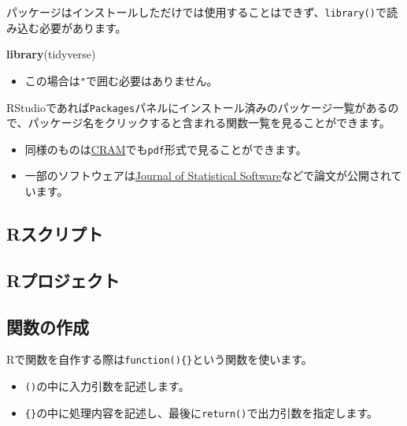 \documentclass[]{bxjsarticle}
\newenvironment{Shaded}{\begin{snugshade}}{\end{snugshade}}
\newcommand{\KeywordTok}[1]{\textcolor[rgb]{0.13,0.29,0.53}{\textbf{#1}}}
\newcommand{\NormalTok}[1]{#1}
\providecommand{\tightlist}{%
  \setlength{\itemsep}{0pt}\setlength{\parskip}{0pt}}
\begin{document}
パッケージはインストールしただけでは使用することはできず、\texttt{library()}で読み込む必要があります。

\begin{Shaded}
\begin{Highlighting}[]
\KeywordTok{library}\NormalTok{(tidyverse)}
\end{Highlighting}
\end{Shaded}

\begin{itemize}
\tightlist
\item
  この場合は\texttt{"}で囲む必要はありません。
\end{itemize}

RStudioであれば\texttt{Packages}パネルにインストール済みのパッケージ一覧があるので、パッケージ名をクリックすると含まれる関数一覧を見ることができます。

\begin{itemize}
\tightlist
\item
  同様のものは\href{https://cran.r-project.org/}{CRAM}でも\texttt{pdf}形式で見ることができます。
\item
  一部のソフトウェアは\href{https://www.jstatsoft.org/index}{Journal of Statistical Software}などで論文が公開されています。
\end{itemize}

\hypertarget{rux30b9ux30afux30eaux30d7ux30c8}{%
\subsection{Rスクリプト}\label{rux30b9ux30afux30eaux30d7ux30c8}}

\hypertarget{rux30d7ux30edux30b8ux30a7ux30afux30c8}{%
\subsection{Rプロジェクト}\label{rux30d7ux30edux30b8ux30a7ux30afux30c8}}

\hypertarget{ux95a2ux6570ux306eux4f5cux6210}{%
\subsection{関数の作成}\label{ux95a2ux6570ux306eux4f5cux6210}}

Rで関数を自作する際は\texttt{function()\{\}}という関数を使います。

\begin{itemize}
\tightlist
\item
  \texttt{()}の中に入力引数を記述します。
\item
  \texttt{\{\}}の中に処理内容を記述し、最後に\texttt{return()}で出力引数を指定します。
\end{itemize}
\end{document}

